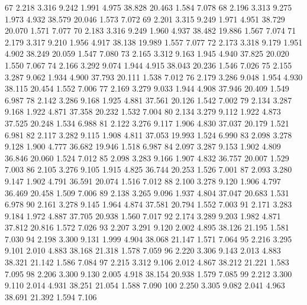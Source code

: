 \documentclass[a4paper,11pt]{scrartcl}
\begin{document}
\begin{Schunk}
\begin{Soutput}
67   2.218  3.316    9.242     1.991  4.975   38.828   20.463    1.584  7.078
68   2.196  3.313    9.275     1.973  4.932   38.579   20.046    1.573  7.072
69   2.201  3.315    9.249     1.971  4.951   38.729   20.070    1.571  7.077
70   2.183  3.316    9.249     1.960  4.937   38.482   19.886    1.567  7.074
71   2.179  3.317    9.210     1.956  4.917   38.138   19.989    1.557  7.077
72   2.173  3.318    9.179     1.951  4.902   38.249   20.059    1.547  7.080
73   2.165  3.312    9.163     1.945  4.940   37.825   20.020    1.550  7.067
74   2.166  3.292    9.074     1.944  4.915   38.043   20.236    1.546  7.026
75   2.155  3.287    9.062     1.934  4.900   37.793   20.111    1.538  7.012
76   2.179  3.286    9.048     1.954  4.930   38.115   20.454    1.552  7.006
77   2.169  3.279    9.033     1.944  4.908   37.946   20.409    1.549  6.987
78   2.142  3.286    9.168     1.925  4.881   37.561   20.126    1.542  7.002
79   2.134  3.287    9.168     1.922  4.871   37.358   20.232    1.532  7.004
80   2.134  3.279    9.112     1.922  4.873   37.525   20.248    1.534  6.988
81   2.122  3.276    9.117     1.906  4.830   37.037   20.179    1.521  6.981
82   2.117  3.282    9.115     1.908  4.811   37.053   19.993    1.524  6.990
83   2.098  3.278    9.128     1.900  4.777   36.682   19.946    1.518  6.987
84   2.097  3.287    9.153     1.902  4.809   36.846   20.060    1.524  7.012
85   2.098  3.283    9.166     1.907  4.832   36.757   20.007    1.529  7.003
86   2.105  3.276    9.105     1.915  4.825   36.744   20.253    1.526  7.001
87   2.093  3.280    9.147     1.902  4.791   36.591   20.074    1.516  7.012
88   2.100  3.278    9.120     1.906  4.797   36.469   20.458    1.509  7.006
89   2.138  3.265    9.096     1.937  4.804   37.047   20.683    1.531  6.978
90   2.161  3.278    9.145     1.964  4.874   37.581   20.794    1.552  7.003
91   2.171  3.283    9.184     1.972  4.887   37.705   20.938    1.560  7.017
92   2.174  3.289    9.203     1.982  4.871   37.812   20.816    1.572  7.026
93   2.207  3.291    9.120     2.002  4.895   38.126   21.195    1.581  7.030
94   2.198  3.300    9.131     1.999  4.904   38.068   21.147    1.571  7.064
95   2.216  3.295    9.101     2.010  4.883   38.168   21.318    1.578  7.059
96   2.220  3.306    9.143     2.013  4.883   38.321   21.142    1.586  7.084
97   2.215  3.312    9.106     2.012  4.867   38.212   21.221    1.583  7.095
98   2.206  3.300    9.130     2.005  4.918   38.154   20.938    1.579  7.085
99   2.212  3.300    9.110     2.014  4.931   38.251   21.054    1.588  7.090
100  2.250  3.305    9.082     2.041  4.963   38.691   21.392    1.594  7.106

\end{Soutput}
\end{Schunk}
\end{document}
